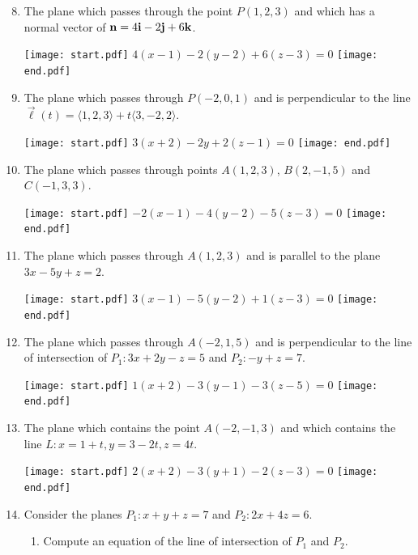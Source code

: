 \documentclass[12pt]{article}
\begin{document}

\begin{enumerate}
\setcounter{enumi}{7}

\item The plane which passes through the point $P(1,2,3)$ and which has a normal vector of ${\bf n}=4{\bf i}-2{\bf j}+6{\bf k}$.

\texttt{[image: start.pdf]}
{{$4(x-1)-2(y-2)+6(z-3)=0$}}
\texttt{[image: end.pdf]}


\item The plane which passes through $P(-2,0,1)$ and is perpendicular to the line $\overrightarrow{\ell}(t)=\langle 1,2,3 \rangle +t \langle 3,-2,2\rangle$.

\texttt{[image: start.pdf]}
{{$3(x+2)-2y+2(z-1)=0$}}
\texttt{[image: end.pdf]}


\item The plane which passes through points $A(1,2,3)$, $B(2,-1,5)$ and $C(-1,3,3)$.

\texttt{[image: start.pdf]}
{{$-2(x-1)-4(y-2)-5(z-3)=0$}}
\texttt{[image: end.pdf]}


\item The plane which passes through $A(1,2,3)$ and is parallel to the plane $3x-5y+z=2$.

\texttt{[image: start.pdf]}
{{$3(x-1)-5(y-2)+1(z-3)=0$}}
\texttt{[image: end.pdf]}


\item The plane which passes through $A(-2,1,5)$ and is perpendicular to the line of intersection of $P_1: 3x+2y-z=5$ and $P_2: -y+z=7$.

\texttt{[image: start.pdf]}
{{$1(x+2)-3(y-1)-3(z-5)=0$}}
\texttt{[image: end.pdf]}


\item The plane which contains the point $A(-2,-1,3)$ and which contains the line $L: x=1+t, y=3-2t, z=4t$.

\texttt{[image: start.pdf]}
{{$2(x+2)-3(y+1)-2(z-3)=0$}}
\texttt{[image: end.pdf]}


\item Consider the planes $P_1: x+y+z=7$ and $P_2: 2x+4z=6$.

\begin{enumerate}

\item Compute an equation of the line of intersection of $P_1$ and $P_2$.


\end{enumerate}
\end{enumerate}
\end{document}
